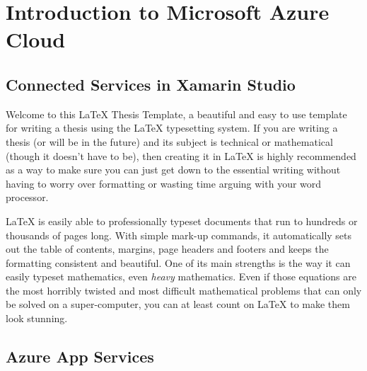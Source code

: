 \chapter{Introduction to Microsoft Azure Cloud} %

\label{Chapter5} %



\section{Connected Services in Xamarin Studio}
Welcome to this \LaTeX{} Thesis Template, a beautiful and easy to use template for writing a thesis using the \LaTeX{} typesetting system.
If you are writing a thesis (or will be in the future) and its subject is technical or mathematical (though it doesn't have to be), then creating it in \LaTeX{} is highly recommended as a way to make sure you can just get down to the essential writing without having to worry over formatting or wasting time arguing with your word processor.

\LaTeX{} is easily able to professionally typeset documents that run to hundreds or thousands of pages long. With simple mark-up commands, it automatically sets out the table of contents, margins, page headers and footers and keeps the formatting consistent and beautiful. One of its main strengths is the way it can easily typeset mathematics, even \emph{heavy} mathematics. Even if those equations are the most horribly twisted and most difficult mathematical problems that can only be solved on a super-computer, you can at least count on \LaTeX{} to make them look stunning.


\section{Azure App Services}

